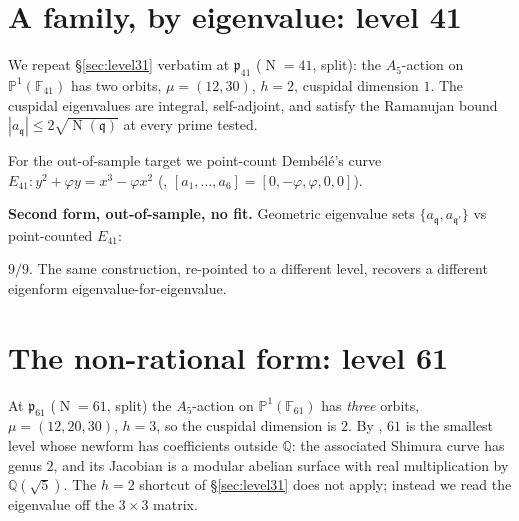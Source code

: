 \documentclass[11pt,a4paper]{article}
\newcommand{\Q}{\mathbb{Q}}
\newcommand{\F}{\mathbb{F}}
\newcommand{\PP}{\mathbb{P}}
\newcommand{\fp}{\mathfrak{p}}
\newcommand{\fq}{\mathfrak{q}}
\DeclareMathOperator{\Nm}{N}
\begin{document}
\section{A family, by eigenvalue: level 41}\label{sec:level41}

We repeat \S\ref{sec:level31} verbatim at $\fp_{41}$ ($\Nm=41$, split):
the $A_5$-action on $\PP^1(\F_{41})$ has two orbits, $\mu=(12,30)$,
$h=2$, cuspidal dimension $1$. The cuspidal eigenvalues are integral,
self-adjoint, and satisfy the Ramanujan bound
$|a_\fq|\le2\sqrt{\Nm(\fq)}$ at every prime tested.

For the out-of-sample target we point-count Demb\'el\'e's curve
$E_{41}:y^2+\varphi y=x^3-\varphi x^2$
(\cite[Tab.~4]{Dembele2005}, $[a_1,\dots,a_6]=[0,-\varphi,\varphi,0,0]$).

\begin{verifiedbox}
\textbf{Second form, out-of-sample, no fit.} Geometric eigenvalue sets
$\{a_\fq,a_{\fq'}\}$ vs point-counted $E_{41}$:
\begin{center}\end{center}
$9/9$. The same construction, re-pointed to a different level, recovers
a different eigenform eigenvalue-for-eigenvalue.
\end{verifiedbox}

\section{The non-rational form: level 61}\label{sec:level61}

At $\fp_{61}$ ($\Nm=61$, split) the $A_5$-action on $\PP^1(\F_{61})$ has
\emph{three} orbits, $\mu=(12,20,30)$, $h=3$, so the cuspidal dimension
is $2$. By \cite[Rem.~4.4]{Dembele2005}, $61$ is the smallest level
whose newform has coefficients outside $\Q$: the associated Shimura
curve has genus $2$, and its Jacobian is a modular abelian surface with
real multiplication by $\Q(\sqrt5)$. The $h=2$ shortcut of
\S\ref{sec:level31} does not apply; instead we read the eigenvalue off
the $3\times3$ matrix.
\end{document}
